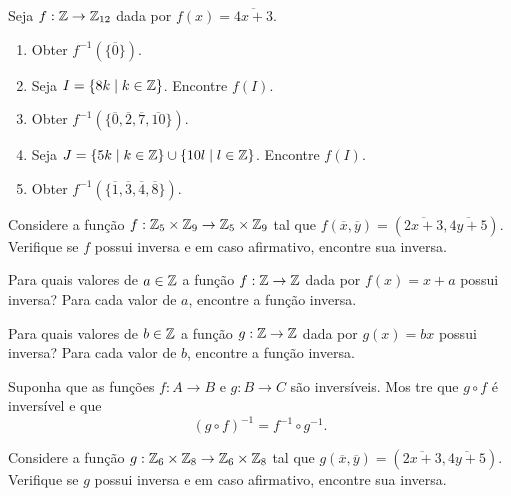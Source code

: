 \documentclass[12pt]{exam}
\begin{document}
    \vspace{.3cm}

    \questao{} Seja $f : \mathbb{Z} \to \mathbb{Z}_{12}$ dada por $f(x) = \overline{4x + 3}$.
    \begin{enumerate}[label={\alph*})]
        \item Obter $f^{-1}(\{\overline{0}\})$.

        \item Seja $I = \{8k \mid k \in \mathbb{Z}\}$. Encontre $f(I)$.

        \item Obter $f^{-1}(\{\overline{0}, \overline{2}, \overline{7}, \overline{10}\})$.

        \item Seja $J = \{5k \mid k \in \mathbb{Z}\} \cup \{10l \mid l \in \mathbb{Z}\}$. Encontre $f(I)$.

        \item Obter $f^{-1}(\{\overline{1}, \overline{3}, \overline{4}, \overline{8}\})$.
    \end{enumerate}

    \vspace{.3cm}

    \questao{} Considere a função $f : \mathbb{Z}_5 \times \mathbb{Z}_9 \to \mathbb{Z}_5 \times \mathbb{Z}_9$ tal que $f(\overline{x},\overline{y}) = (\overline{2x + 3}, \overline{4y + 5})$. Verifique se $f$ possui inversa e em caso afirmativo, encontre sua inversa.

    \vspace{.3cm}

    \questao{} Para quais valores de $a \in \mathbb{Z}$ a função $f : \mathbb{Z} \to \mathbb{Z}$ dada por $f(x)       = x + a$ possui inversa? Para cada valor de $a$, encontre a função inversa.

    \vspace{.3cm}

    \questao{} Para quais valores de $b \in \mathbb{Z}$ a função $g : \mathbb{Z} \to \mathbb{Z}$ dada por $g(x)       = bx$ possui inversa? Para cada valor de $b$, encontre a função inversa.

    \vspace{.3cm}

    \questao{} Suponha que as funções $f : A \to B$ e $g : B \to C$ são inversíveis. Mos      tre que $g \circ f$ é inversível e que
    \[
        (g \circ f)^{-1} = f^{-1} \circ g^{-1}.
    \]

    \vspace{.3cm}

    \questao{} Considere a função $g : \mathbb{Z}_6 \times \mathbb{Z}_8 \to \mathbb{Z}_6 \times \mathbb{Z}_8$ tal que $g(\overline{x},\overline{y}) = (\overline{2x + 3}, \overline{4y + 5})$. Verifique se $g$ possui inversa e em caso afirmativo, encontre sua inversa.
\end{document}
